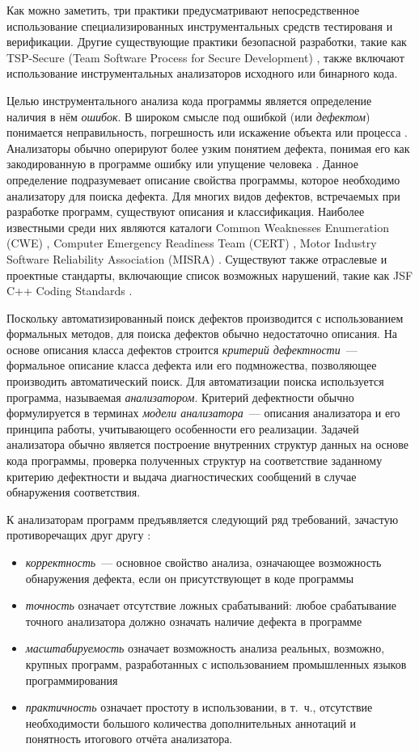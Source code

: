 Как можно заметить, три практики предусматривают непосредственное использование специализированных инструментальных средств тестированя и верификации. Другие существующие практики безопасной разработки, такие как TSP-Secure (Team Software Process for Secure Development) \cite{tsp}, также включают использование инструментальных анализаторов исходного или бинарного кода.

Целью инструментального анализа кода программы является определение наличия в нём \textit{ошибок}. В широком смысле под ошибкой (или \textit{дефектом}) понимается неправильность, погрешность или искажение объекта или процесса \cite{lipaev-soft-eng}. Анализаторы обычно оперируют более узким понятием дефекта, понимая его как закодированную в программе ошибку или упущение человека \cite{cert-book}. Данное определение подразумевает описание свойства программы, которое необходимо анализатору для поиска дефекта. Для многих видов дефектов, встречаемых при разработке программ, существуют описания и классификация. Наиболее известными среди них являются каталоги Common Weaknesses Enumeration (CWE) \cite{cwe}, Computer Emergency Readiness Team (CERT) \cite{cert-org}, Motor Industry Software Reliability Association (MISRA) \cite{misra}. Существуют также отраслевые и проектные стандарты, включающие список возможных нарушений, такие как JSF C++ Coding Standards \cite{jsf}.

Поскольку автоматизированный поиск дефектов производится с использованием формальных методов, для поиска дефектов обычно недостаточно описания. На основе описания класса дефектов строится \textit{критерий дефектности}~--- формальное описание класса дефекта или его подмножества, позволяющее производить автоматический поиск. Для автоматизации поиска используется программа, называемая \textit{анализатором}. Критерий дефектности обычно формулируется в терминах \textit{модели анализатора}~--- описания анализатора и его принципа работы, учитывающего особенности его реализации. Задачей анализатора обычно является построение внутренних структур данных на основе кода программы, проверка полученных структур на соответствие заданному критерию дефектности и выдача диагностических сообщений в случае обнаружения соответствия.

К анализаторам программ предъявляется следующий ряд требований, зачастую противоречащих друг другу \cite{sens}:
\begin{itemize}
 \item \textit{корректность}~--- основное свойство анализа, означающее возможность обнаружения дефекта, если он присутствующет в коде программы
 \item \textit{точность} означает отсутствие ложных срабатываний: любое срабатывание точного анализатора должно означать наличие дефекта в программе
 \item \textit{масштабируемость} означает возможность анализа реальных, возможно, крупных программ, разработанных с использованием промышленных языков программирования
 \item \textit{практичность} означает простоту в использовании, в т.~ч., отсутствие необходимости большого количества дополнительных аннотаций и понятность итогового отчёта анализатора.
\end{itemize}

